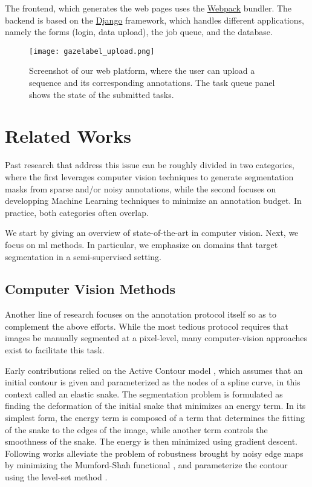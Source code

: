 The frontend, which generates the web pages uses the \href{https://webpack.js.org}{Webpack} bundler.
The backend is based on the \href{https://www.djangoproject.com/}{Django} framework, which handles different applications, namely the forms (login, data upload), the job queue, and the database.

\begin{figure}[!htpb]
  \texttt{[image: gazelabel\_upload.png]}
  \caption{Screenshot of our web platform, where the user can upload a sequence and its corresponding annotations. The task queue panel shows the state of the submitted tasks.}
  \label{fig:anna_upload}
\end{figure}



\section{Related Works}

Past research that address this issue can be roughly divided in two categories,
where the first leverages computer vision techniques to generate segmentation masks from sparse and/or noisy annotations, while the second focuses on developping Machine Learning techniques to minimize an annotation budget.
In practice, both categories often overlap.

We start by giving an overview of state-of-the-art in computer vision.
Next, we focus on \gls{ml} methods.
In particular, we emphasize on domains that target segmentation in a semi-supervised setting.

\subsection{Computer Vision Methods}
Another line of research focuses on the annotation protocol itself so as to complement the above efforts.
While the most tedious protocol requires that images be manually segmented at a pixel-level, many computer-vision approaches exist to facilitate this task.

Early contributions relied on the Active Contour model \cite{kass88}, which assumes that an initial contour is given and parameterized as the nodes of a spline curve, in this context called an elastic snake.
The segmentation problem is formulated as finding the deformation of the initial snake that minimizes an energy term.
In its simplest form, the energy term is composed of a term that determines the fitting of the snake to the edges of the image, while another term controls the smoothness of the snake.
The energy is then minimized using gradient descent.
Following works alleviate the problem of robustness brought by noisy edge maps by minimizing the Mumford-Shah functional \cite{chan01}, and parameterize the contour using the level-set method \cite{osher88}.

